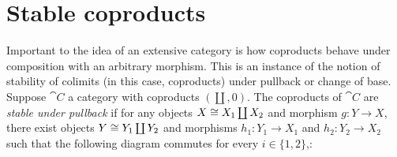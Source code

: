 \section{Stable coproducts}
\label{sec:stable-coproducts}

Important to the idea of an extensive category is how coproducts behave under composition with an arbitrary
morphism. This is an instance of the notion of stability of colimits (in this case, coproducts) under pullback
or change of base. Suppose $\cat{C}$ a category with coproducts $(\coprod, 0)$. The coproducts of $\cat{C}$
are \emph{stable under pullback} if for any objects $X \cong X_1 \coprod X_2$ and morphism $g: Y \to X$, there
exist objects $Y \cong Y_1 \coprod Y_2$ and morphisms $h_1: Y_1 \to X_1$ and $h_2: Y_2 \to X_2$ such that the
following diagram commutes for every $i \in \{1, 2\}$,:

\begin{center}
\end{center}
